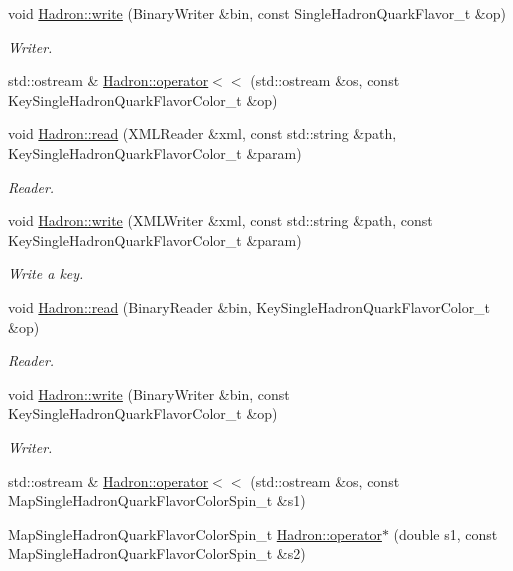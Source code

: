 \begin{DoxyCompactItemize}
void \mbox{\hyperlink{namespaceHadron_a2994f8fc2ad609574b948b8671232dd8}{Hadron\+::write}} (Binary\+Writer \&bin, const Single\+Hadron\+Quark\+Flavor\+\_\+t \&op)
\begin{DoxyCompactList}\small\item\em Writer. \end{DoxyCompactList}\item 
std\+::ostream \& \mbox{\hyperlink{namespaceHadron_ac39a55fe17a7ba63e515041398ff55e4}{Hadron\+::operator$<$$<$}} (std\+::ostream \&os, const Key\+Single\+Hadron\+Quark\+Flavor\+Color\+\_\+t \&op)
\item 
void \mbox{\hyperlink{namespaceHadron_a3b1ec7d213815eedf06fcd0e518eb5d3}{Hadron\+::read}} (X\+M\+L\+Reader \&xml, const std\+::string \&path, Key\+Single\+Hadron\+Quark\+Flavor\+Color\+\_\+t \&param)
\begin{DoxyCompactList}\small\item\em Reader. \end{DoxyCompactList}\item 
void \mbox{\hyperlink{namespaceHadron_a64d17f6dc5e4987b14cc4a2d33401b7c}{Hadron\+::write}} (X\+M\+L\+Writer \&xml, const std\+::string \&path, const Key\+Single\+Hadron\+Quark\+Flavor\+Color\+\_\+t \&param)
\begin{DoxyCompactList}\small\item\em Write a key. \end{DoxyCompactList}\item 
void \mbox{\hyperlink{namespaceHadron_afc23e5e61669cc277e94a613ee812b0f}{Hadron\+::read}} (Binary\+Reader \&bin, Key\+Single\+Hadron\+Quark\+Flavor\+Color\+\_\+t \&op)
\begin{DoxyCompactList}\small\item\em Reader. \end{DoxyCompactList}\item 
void \mbox{\hyperlink{namespaceHadron_a36eb0d304eb3644075b1598cde742d87}{Hadron\+::write}} (Binary\+Writer \&bin, const Key\+Single\+Hadron\+Quark\+Flavor\+Color\+\_\+t \&op)
\begin{DoxyCompactList}\small\item\em Writer. \end{DoxyCompactList}\item 
std\+::ostream \& \mbox{\hyperlink{namespaceHadron_aa68c7efacb8bc21a4d87aede8544def5}{Hadron\+::operator$<$$<$}} (std\+::ostream \&os, const Map\+Single\+Hadron\+Quark\+Flavor\+Color\+Spin\+\_\+t \&s1)
\item 
Map\+Single\+Hadron\+Quark\+Flavor\+Color\+Spin\+\_\+t \mbox{\hyperlink{namespaceHadron_af8f26e76a642072270a910f3326d758f}{Hadron\+::operator$\ast$}} (double s1, const Map\+Single\+Hadron\+Quark\+Flavor\+Color\+Spin\+\_\+t \&s2)

\end{DoxyCompactItemize}
